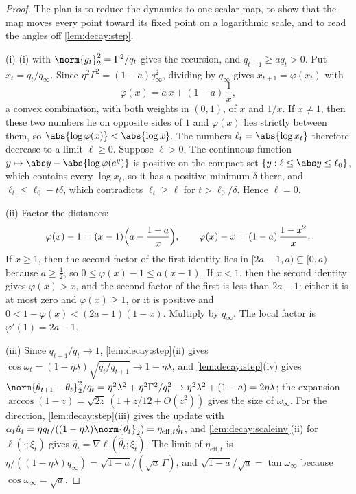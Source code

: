 \begin{refsection}
\begin{proof}
The plan is to reduce the dynamics to one scalar map, to show that the map moves every point toward its fixed point on a logarithmic scale, and to read the angles off \cref{lem:decay:step}.

(i) (i) with $\norm{g_t}_2^2=\Gamma^2/q_t$ gives the recursion, and $q_{t+1}\ge aq_t>0$. Put $x_t=q_t/q_\infty$. Since $\eta^2\Gamma^2=(1-a)q_\infty^2$, dividing by $q_\infty$ gives $x_{t+1}=\varphi(x_t)$ with
\[
  \varphi(x)=a\,x+(1-a)\,\frac1x ,
\]
a convex combination, with both weights in $(0,1)$, of $x$ and $1/x$. If $x\ne1$, then these two numbers lie on opposite sides of $1$ and $\varphi(x)$ lies strictly between them, so $\abs{\log\varphi(x)}<\abs{\log x}$. The numbers $\ell_t=\abs{\log x_t}$ therefore decrease to a limit $\ell\ge0$. Suppose $\ell>0$. The continuous function $y\mapsto\abs y-\abs{\log\varphi(e^y)}$ is positive on the compact set $\{y:\ell\le\abs y\le\ell_0\}$, which contains every $\log x_t$, so it has a positive minimum $\delta$ there, and $\ell_t\le\ell_0-t\delta$, which contradicts $\ell_t\ge\ell$ for $t>\ell_0/\delta$. Hence $\ell=0$.

(ii) Factor the distances:
\begin{equation}\label{eq:decay:factor}
  \varphi(x)-1=(x-1)\Bigl(a-\frac{1-a}x\Bigr),\qquad \varphi(x)-x=(1-a)\,\frac{1-x^2}x .
\end{equation}
If $x\ge1$, then the second factor of the first identity lies in $[2a-1,a)\subseteq[0,a)$ because $a\ge\frac12$, so $0\le\varphi(x)-1\le a(x-1)$. If $x<1$, then the second identity gives $\varphi(x)>x$, and the second factor of the first is less than $2a-1$: either it is at most zero and $\varphi(x)\ge1$, or it is positive and $0<1-\varphi(x)<(2a-1)(1-x)$. Multiply by $q_\infty$. The local factor is $\varphi'(1)=2a-1$.

(iii) Since $q_{t+1}/q_t\to1$, \cref{lem:decay:step}(ii) gives $\cos\omega_t=(1-\eta\lambda)\sqrt{q_t/q_{t+1}}\to1-\eta\lambda$, and \cref{lem:decay:step}(iv) gives $\norm{\theta_{t+1}-\theta_t}_2^2/q_t=\eta^2\lambda^2+\eta^2\Gamma^2/q_t^2\to\eta^2\lambda^2+(1-a)=2\eta\lambda$; the expansion $\arccos(1-z)=\sqrt{2z}\,(1+z/12+O(z^2))$ gives the size of $\omega_\infty$. For the direction, \cref{lem:decay:step}(iii) gives the update with $\alpha_t\hat u_t=\eta g_t/((1-\eta\lambda)\norm{\theta_t}_2)=\eta_{\mathrm{eff},t}\hat g_t$, and \cref{lem:decay:scaleinv}(ii) for $\ell(\cdot;\xi_t)$ gives $\hat g_t=\nabla\ell(\hat\theta_t;\xi_t)$. The limit of $\eta_{\mathrm{eff},t}$ is $\eta/((1-\eta\lambda)q_\infty)=\sqrt{1-a}/(\sqrt a\,\Gamma)$, and $\sqrt{1-a}/\sqrt a=\tan\omega_\infty$ because $\cos\omega_\infty=\sqrt a$.


\end{proof}
\end{refsection}

